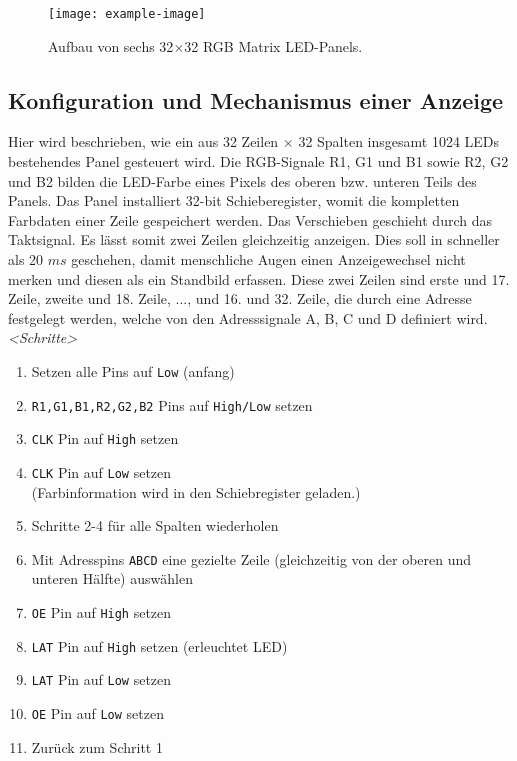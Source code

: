 \begin{figure}
	\centering
	\texttt{[image: example-image]}
	\caption[Aufbau von sechs 32$\times$32 RGB Matrix LED-Panels]{Aufbau von sechs 32$\times$32 RGB Matrix LED-Panels. }
	\label{fig:assembly:dice}
\end{figure}

\subsection{Konfiguration und Mechanismus einer Anzeige}
Hier wird beschrieben, wie ein aus 32 Zeilen $\times$ 32 Spalten insgesamt 1024 LEDs bestehendes Panel gesteuert wird. Die  RGB-Signale R1, G1 und B1 sowie R2, G2 und B2 bilden die LED-Farbe eines Pixels des oberen bzw. unteren Teils des Panels. Das Panel installiert 32-bit Schieberegister, womit die kompletten Farbdaten einer Zeile gespeichert werden. Das Verschieben geschieht durch das Taktsignal. Es lässt somit zwei Zeilen gleichzeitig anzeigen. Dies soll in schneller als 20 $ms$ geschehen, damit menschliche Augen einen Anzeigewechsel nicht merken und diesen als ein Standbild erfassen. Diese zwei Zeilen sind erste und 17. Zeile, zweite und 18. Zeile, ..., und 16. und 32. Zeile, die durch eine Adresse festgelegt werden, welche von den Adresssignale A, B, C und D definiert wird.\\

\emph{<Schritte>}
\begin{enumerate}
	\item Setzen alle Pins auf \texttt{Low} (anfang)
	\item \texttt{R1,G1,B1,R2,G2,B2} Pins auf \texttt{High/Low} setzen
	\item \texttt{CLK} Pin auf \texttt{High} setzen
	\item \texttt{CLK} Pin auf \texttt{Low} setzen \\
	(Farbinformation wird in den Schiebregister geladen.)
	\item Schritte 2-4 für alle Spalten wiederholen
	\item Mit Adresspins \texttt{ABCD} eine gezielte Zeile (gleichzeitig von der oberen und unteren Hälfte) auswählen
	\item \texttt{OE} Pin auf \texttt{High} setzen
	\item \texttt{LAT} Pin auf \texttt{High} setzen (erleuchtet LED)
	\item \texttt{LAT} Pin auf \texttt{Low} setzen
	\item \texttt{OE} Pin auf \texttt{Low} setzen
	\item Zurück zum Schritt 1
\end{enumerate}

